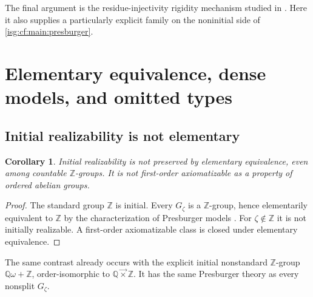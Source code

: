 \documentclass[11pt]{article}
\newtheorem{corollary}[corollary]{Corollary}
\theoremstyle{definition}
\theoremstyle{remark}
\newcommand{\Z}{\mathbb{Z}}
\newcommand{\lex}{\mathbin{\overrightarrow{\times}}}
\newcommand{\Q}{\mathbb{Q}}
\begin{document}
The final argument is the residue-injectivity rigidity mechanism studied
in \cite{Jerabek}. Here it also supplies a particularly explicit family
on the noninitial side of \cref{isg:cf:main:presburger}.

\section{Elementary equivalence, dense models, and omitted types}\label{isg:cf:sec:modeltheory}

\subsection{Initial realizability is not elementary}
\begin{corollary}\label{isg:cf:cor:nonelementary}
Initial realizability is not preserved by elementary equivalence, even
among countable $\Z$-groups. It is not first-order axiomatizable as a
property of ordered abelian groups.
\end{corollary}
\begin{proof}
The standard group $\Z$ is initial. Every $G_\zeta$ is a $\Z$-group,
hence elementarily equivalent to $\Z$ by the characterization of
Presburger models \cite{Jerabek}. For $\zeta\notin\Z$ it is not
initially realizable. A first-order axiomatizable class is closed under
elementary equivalence.
\end{proof}

The same contrast already occurs with the explicit initial nonstandard
$\Z$-group $\Q\omega+\Z$, order-isomorphic to $\Q\lex\Z$.
It has the same Presburger theory as every nonsplit $G_\zeta$.
\end{document}
